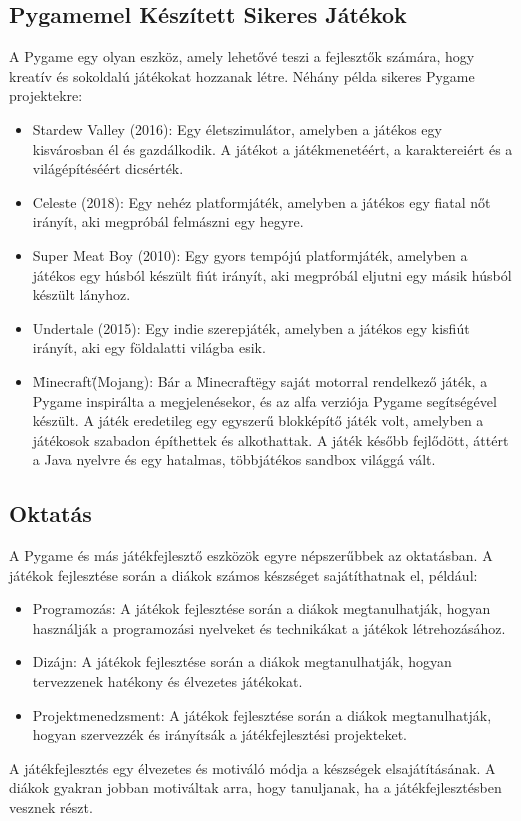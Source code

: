 \subsection{Pygamemel Készített Sikeres Játékok}
A Pygame egy olyan eszköz, amely lehetővé teszi a fejlesztők számára, hogy kreatív és sokoldalú játékokat hozzanak létre. Néhány példa sikeres Pygame projektekre:

\begin{itemize}
    
    \item Stardew Valley (2016): Egy életszimulátor, amelyben a játékos egy kisvárosban él és gazdálkodik. A játékot a játékmenetéért, a karaktereiért és a világépítéséért dicsérték.
    
    \item Celeste (2018): Egy nehéz platformjáték, amelyben a játékos egy fiatal nőt irányít, aki megpróbál felmászni egy hegyre.
    
    \item Super Meat Boy (2010): Egy gyors tempójú platformjáték, amelyben a játékos egy húsból készült fiút irányít, aki megpróbál eljutni egy másik húsból készült lányhoz.
    
    \item Undertale (2015): Egy indie szerepjáték, amelyben a játékos egy kisfiút irányít, aki egy földalatti világba esik.


    \item\"Minecraft\" (Mojang): Bár a \"Minecraft\" egy saját motorral rendelkező játék, a Pygame inspirálta a megjelenésekor, és az alfa verziója Pygame segítségével készült.  A játék eredetileg egy egyszerű blokképítő játék volt, amelyben a játékosok szabadon építhettek és alkothattak. A játék később fejlődött, áttért a Java nyelvre és egy hatalmas, többjátékos sandbox világgá vált.
    
\end{itemize}

\subsection{Oktatás} 
A Pygame és más játékfejlesztő eszközök egyre népszerűbbek az oktatásban. A játékok fejlesztése során a diákok számos készséget sajátíthatnak el, például:


\begin{itemize}
    
    \item Programozás: A játékok fejlesztése során a diákok megtanulhatják, hogyan használják a programozási nyelveket és technikákat a játékok létrehozásához.
    \item Dizájn: A játékok fejlesztése során a diákok megtanulhatják, hogyan tervezzenek hatékony és élvezetes játékokat.
    \item Projektmenedzsment: A játékok fejlesztése során a diákok megtanulhatják, hogyan szervezzék és irányítsák a játékfejlesztési projekteket.
\end{itemize}
A játékfejlesztés egy élvezetes és motiváló módja a készségek elsajátításának. A diákok gyakran jobban motiváltak arra, hogy tanuljanak, ha a játékfejlesztésben vesznek részt.


